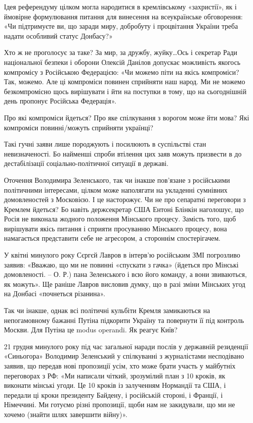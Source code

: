 Ідея референдуму цілком могла народитися в кремлівському «захристії», як і
ймовірне формулювання питання для винесення на всеукраїнське обговорення: «Чи
підтримуєте ви, що заради миру, добробуту і процвітання України треба надати
особливий статус Донбасу?»

Хто ж не проголосує за таке? За мир, за дружбу, жуйку…Ось і секретар Ради
національної безпеки і оборони Олексій Данілов допускає можливість якогось
компромісу з Російською Федерацією: «Чи можемо піти на якісь компроміси? Так,
можемо. Але ці компроміси повинен сприйняти наш народ. Ми не можемо
безкомпромісно щось вирішувати і йти на поступки в тому, що на сьогоднішній
день пропонує Російська Федерація».

Про які компроміси йдеться? Про яке спілкування з ворогом може йти мова? Які
компроміси повинні/можуть сприйняти українці?

Такі гучні заяви лише породжують і посилюють в суспільстві стан невизначеності.
Бо найменші спроби втілення цих заяв можуть призвести в до дестабілізації
соціально-політичної ситуації в державі.

Оточення Володимира Зеленського, так чи інакше пов'язане з російськими
політичними інтересами, цілком може наполягати на укладенні сумнівних
домовленостей з Московією. І це насторожує. Чи не про сепаратні переговори з
Кремлем йдеться? Бо навіть держсекретар США Ентоні Блінкін наголошує, що Росія
не виконала жодного положення Мінського процесу. Замість того, щоб вирішувати
якісь питання і сприяти просуванню Мінського процесу, вона намагається
представити себе не агресором, а стороннім спостерігачем.

У квітні минулого року Сєргєй Лавров в інтерв'ю російським ЗМІ погрозливо
заявив: «Вважаю, що ми не повинні «спускати з гачка» (йдеться про Мінські
домовленості. – О. Р.) пана Зеленського і всю його команду, а вони звиваються,
як можуть». Ще раніше Лавров висловив думку, що в разі зміни Мінських угод на
Донбасі «почнеться різанина».

Так чи інакше, однак всі політичні кульбіти Кремля замикаються на непогамовному
бажанні Путіна підкорити Україну та повернути її під контроль Москви. Для
Путіна це modus operandi. Як реагує Київ?

21 грудня минулого року під час загальної наради послів у державній резиденції
«Синьогора» Володимир Зеленський у спілкуванні з журналістами несподівано
заявив, що передав нові пропозиції усім, хто може брати участь у майбутніх
переговорах з РФ: «Ми написали чіткий, зрозумілий план з 10 кроків, як виконати
мінські угоди. Це 10 кроків із залученням Нормандії та США, і передали ці кроки
президенту Байдену, і російській стороні, і Франції, і Німеччині. Ми готуємо
різні пропозиції, щоби нам не закидували, що ми не хочемо (знайти шлях
завершити війну)».

